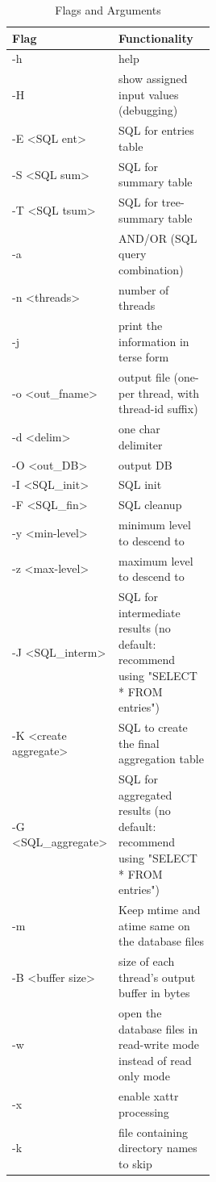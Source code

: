 \begin{table} [H]
  \centering
  \begin{tabular*}{\linewidth}{l|p{0.5\linewidth}}
    Flag & Functionality \\\hline
    -h & help\\
    \hline
    -H & show assigned input values (debugging)\\
    \hline
    -E \textless SQL ent\textgreater & SQL for entries table \\
    \hline
    -S \textless SQL sum\textgreater & SQL for summary table\\
    \hline
    -T \textless SQL tsum\textgreater & SQL for tree-summary table\\
    \hline
    -a & AND/OR (SQL query combination)\\
    \hline
    -n \textless threads\textgreater & number of threads\\
    \hline
    -j & print the information in terse form\\
    \hline
    -o \textless out\_fname\textgreater & output file (one-per thread, with thread-id suffix) \\
    \hline
    -d \textless delim\textgreater & one char delimiter \\
    \hline
    -O \textless out\_DB\textgreater & output DB \\
    \hline
    -I \textless SQL\_init\textgreater & SQL init \\
    \hline
    -F \textless SQL\_fin\textgreater & SQL cleanup \\
    \hline
    -y \textless min-level\textgreater & minimum level to descend to \\
    \hline
    -z \textless max-level\textgreater & maximum level to descend to\\
    \hline
    -J \textless SQL\_interm\textgreater & SQL for intermediate results (no default: recommend using "SELECT * FROM entries") \\
    \hline
    -K \textless create aggregate\textgreater & SQL to create the final aggregation table\\
    \hline
    -G \textless SQL\_aggregate\textgreater & SQL for aggregated results (no default: recommend using "SELECT * FROM entries")\\
    \hline
    -m & Keep mtime and atime same on the database files \\
    \hline
    -B \textless buffer size\textgreater & size of each thread's output buffer in bytes \\
    \hline
    -w & open the database files in read-write mode instead of read only mode \\
    \hline
    -x & enable xattr processing \\
    \hline
    -k & file containing directory names to skip \\
    \hline
  \end{tabular*}
  \caption{\label{tab:widgets} \gufiquery Flags and Arguments}
\end{table}

